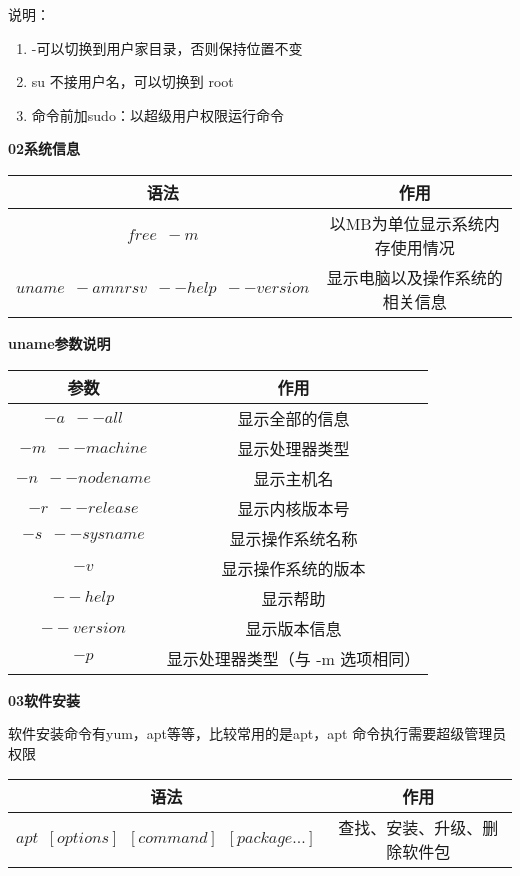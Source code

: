 说明：
\begin{enumerate}
	\item -\enspace 可以切换到用户家目录，否则保持位置不变
	\item su 不接用户名，可以切换到 root 
	\item 命令前加sudo：以超级用户权限运行命令
\end{enumerate}

\textbf{02系统信息}

\begin{table}[!htbp]
	\centering
	\begin{tabular}{cc}
		\toprule[1.5pt]
		语法 & 作用\\
		\midrule[1pt]
		$free\enspace -m$			&以MB为单位显示系统内存使用情况\\
		$uname \enspace -amnrsv \enspace --help \enspace --version$			&显示电脑以及操作系统的相关信息\\
		\bottomrule[1.5pt]
	\end{tabular}
\end{table}

\begin{center}
\textbf{uname参数说明}

	\begin{tabular}{cc}
		\toprule[1.5pt]
		参数 & 作用\\
		\midrule[1pt]
		$-a\enspace --all$		&显示全部的信息\\
		$-m\enspace --machine $		&显示处理器类型\\
		$-n\enspace --nodename $		&显示主机名\\
		$-r\enspace --release $		&显示内核版本号\\
		$-s\enspace --sysname $		&显示操作系统名称\\
		$-v $		&显示操作系统的版本\\
		$--help $		&显示帮助\\
		$--version $		&显示版本信息\\
		$-p $		&显示处理器类型（与 -m 选项相同）\\
		\bottomrule[1.5pt]
	\end{tabular}
\end{center}

\textbf{03软件安装}

软件安装命令有yum，apt等等，比较常用的是apt，apt 命令执行需要超级管理员权限

\begin{table}[!htbp]
	\centering
	\begin{tabular}{cc}
		\toprule[1.5pt]
		语法 & 作用\\
		\midrule[1pt]
		$  apt\enspace [options] \enspace [command] \enspace [package ...]$		&查找、安装、升级、删除软件包\\
		\bottomrule[1.5pt]
	\end{tabular}
\end{table}


